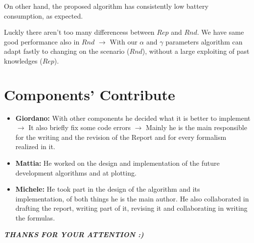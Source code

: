 \documentclass[12pt]{article}
\begin{document}
On other hand, the proposed algorithm has consistently low battery consumption, as expected.

Luckly there aren't too many differencess between $Rep$ and $Rnd$. We have same good performance also in $Rnd$ $\rightarrow$ With our $\alpha$ and $\gamma$ parameters algorithm can adapt fastly to changing on the scenario ($Rnd$), without a large exploiting of past knowledges ($Rep$).
\section{Components' Contribute}

\begin{itemize}

    \item \textbf{Giordano:} With other components he decided what it is better to implement $\rightarrow$ It also briefly fix some code errors $\rightarrow$ Mainly he is the main responsible for the writing and the revision of the Report and for every formalism realized in it.
    
    
    \item \textbf{Mattia:} He worked on the design and implementation of the future development algorithms and at plotting.
    
    \item \textbf{Michele:} He took part in the design of the algorithm and its implementation, of both things he is the main author. He also collaborated in drafting the report, writing part of it, revising it and collaborating in writing the formulas.
    
\end{itemize}


\textbf{\textit{THANKS FOR YOUR ATTENTION :)}}
\end{document}
